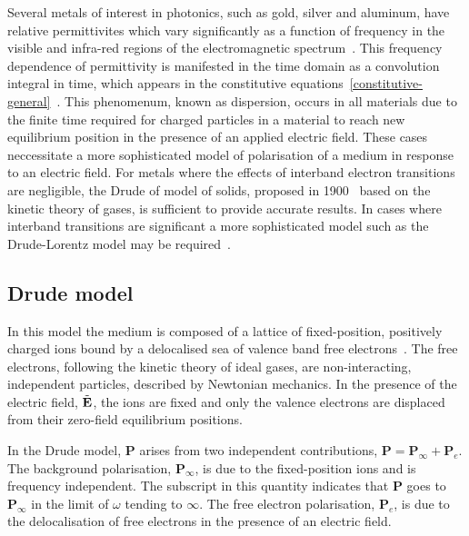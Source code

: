 Several metals of interest in photonics, such as gold, silver and aluminum, have relative permittivites which vary significantly as a function of frequency in the visible and infra-red regions of the electromagnetic spectrum~\cite{Ordal:1983bg}.
This frequency dependence of permittivity is manifested in the time domain as a convolution integral in time, which appears in the constitutive equations~\eqref{constitutive-general}~\cite{Jackson:490457}.
This phenomenum, known as dispersion, occurs in all materials due to the finite time required for charged particles in a material to reach new equilibrium position in the presence of an applied electric field.
These cases neccessitate a more sophisticated model of polarisation of a medium in response to an electric field. For metals where the effects of interband electron transitions are negligible, the Drude of model of solids, proposed in 1900~\cite{Drude:1900hg} based on the kinetic theory of gases, is sufficient to provide accurate results. In cases where interband transitions are significant a more sophisticated model such as the Drude-Lorentz model may be required~\cite{Fox:2001wm,Taflove:1989ds}.

\subsection{Drude model}
\label{sub:The Drude Model}
In this model the medium is composed of a lattice of fixed-position, positively charged ions bound by a delocalised sea of valence band free electrons~\cite{Ashcroft:2005wp,Bandyopadhyay:1503732}. The free electrons, following the kinetic theory of ideal gases, are non-interacting, independent particles, described by Newtonian mechanics. In the presence of the electric field, $\tilde{\mathbf{E}}$, the ions are fixed and only the valence electrons are displaced from their zero-field equilibrium positions.
%

In the Drude model, $\mathbf{P}$ arises from two independent contributions, $\mathbf{P} = \mathbf{P}_{\infty} + \mathbf{P}_e$. The background polarisation, $\mathbf{P}_{\infty}$, is due to the fixed-position ions and is frequency independent. The subscript in this quantity indicates that $\mathbf{P}$ goes to $\mathbf{P}_{\infty}$ in the limit of $\omega$ tending to $\infty$. The free electron polarisation, $\mathbf{P}_e$, is due to the delocalisation of free electrons in the presence of an electric field.

